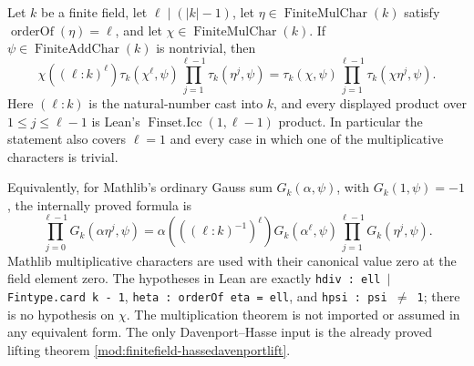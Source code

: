 \begin{theorem}\label{mod:finitefield-hassedavenportproduct}
Let $k$ be a finite field, let $\ell\mid(\lvert k\rvert-1)$, let
$\eta\in\operatorname{FiniteMulChar}(k)$ satisfy
$\operatorname{orderOf}(\eta)=\ell$, and let
$\chi\in\operatorname{FiniteMulChar}(k)$.  If
$\psi\in\operatorname{FiniteAddChar}(k)$ is nontrivial, then
\[
 \boxed{
 \chi\!\left((\ell:k)^\ell\right)
 \tau_k(\chi^\ell,\psi)
 \prod_{j=1}^{\ell-1}\tau_k(\eta^j,\psi)
 =
 \tau_k(\chi,\psi)
 \prod_{j=1}^{\ell-1}\tau_k(\chi\eta^j,\psi).}
\]
Here $(\ell:k)$ is the natural-number cast into $k$, and every displayed
product over $1\leq j\leq\ell-1$ is Lean's
$\operatorname{Finset.Icc}(1,\ell-1)$ product.  In particular the
statement also covers $\ell=1$ and every case in which one of the
multiplicative characters is trivial.

Equivalently, for Mathlib's ordinary Gauss sum
$G_k(\alpha,\psi)$, with $G_k(1,\psi)=-1$, the internally proved formula
is
\[
 \prod_{j=0}^{\ell-1}G_k(\alpha\eta^j,\psi)
 =
 \alpha\!\left(((\ell:k)^{-1})^\ell\right)
 G_k(\alpha^\ell,\psi)
 \prod_{j=1}^{\ell-1}G_k(\eta^j,\psi).
\]
\leanok
{}
\FormalizationContract Mathlib multiplicative characters are used with their
canonical value zero at the field element zero.  The hypotheses in Lean are
exactly
\texttt{hdiv : ell $\mid$ Fintype.card k - 1},
\texttt{heta : orderOf eta = ell}, and
\texttt{hpsi : psi $\ne$ 1}; there is no hypothesis on $\chi$.
The multiplication theorem is not imported or assumed in any equivalent
form.  The only Davenport--Hasse input is the already proved lifting theorem
\ref{mod:finitefield-hassedavenportlift}.
\end{theorem}
